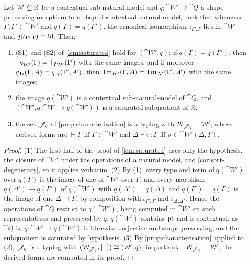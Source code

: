\begin{corollary}\label{cor:sub-typing}
    Let $\mathcal{W}' \subseteq \mathcal{R}$ be a contextual sub-natural-model and $q : \cat{W}' \to \cat{Q}$ a shape-preserving morphism to a shaped contextual natural model, such that whenever $\Gamma, \Gamma' \in \cat{W}'$ and $q(\Gamma) = q(\Gamma')$, the canonical isomorphism $\iota_{\Gamma', \Gamma}$ lies in $\cat{W}'$ and $q(\iota_{\Gamma', \Gamma}) = \mathrm{id}$. Then:
    \begin{enumerate}
        \item (S1) and (S2) of \cref{lem:saturated} hold for $(\cat{W}', q)$: if $q(\Gamma) = q(\Gamma')$, then $\mathsf{Ty}_{\mathcal{W}'}(\Gamma) = \mathsf{Ty}_{\mathcal{W}'}(\Gamma')$ with the same images, and if moreover $q_{\mathsf{Ty}}(\Gamma, A) = q_{\mathsf{Ty}}(\Gamma', A')$, then $\mathsf{Tm}_{\mathcal{W}'}(\Gamma, A) = \mathsf{Tm}_{\mathcal{W}'}(\Gamma', A')$ with the same images;
        \item the image $q(\cat{W}')$ is a contextual sub-natural-model of $\cat{Q}$, and $(\cat{W}', q : \cat{W}' \to q(\cat{W}'))$ is a saturated subquotient of $\mathcal{R}$;
        \item the set $\mathscr{J}_q$ of \cref{prop:characterisation} is a typing with $\mathcal{W}_{\mathscr{J}_q} = \mathcal{W}'$, whose derived forms are $\vdash \Gamma$ iff $\Gamma \in \cat{W}'$ and $\Delta \vdash \sigma : \Gamma$ iff $\sigma \in \cat{W}'(\Delta, \Gamma)$.
    \end{enumerate}
\end{corollary}

\begin{proof}
    (1) The first half of the proof of \cref{lem:saturated} uses only the hypothesis, the closure of $\cat{W}'$ under the operations of a natural model, and \cref{cor:sort-degeneracy}, so it applies verbatim. (2) By (1), every type and term of $q(\cat{W}')$ over $q(\Gamma)$ is the image of one of $\cat{W}'$ over $\Gamma$, and every morphism $q(\Delta') \to q(\Gamma')$ of $q(\cat{W}')$ with $q(\Delta') = q(\Delta)$ and $q(\Gamma') = q(\Gamma)$ is the image of one $\Delta \to \Gamma$, by composition with $\iota_{\Gamma', \Gamma}$ and $\iota_{\Delta, \Delta'}$. Hence the operations of $\cat{Q}$ restrict to $q(\cat{W}')$, being computed in $\cat{W}'$ on such representatives and preserved by $q$; $q(\cat{W}')$ contains $\mathrm{pt}$ and is contextual, as $\cat{Q}$ is; $q : \cat{W}' \to q(\cat{W}')$ is fibrewise surjective and shape-preserving; and the subquotient is saturated by hypothesis. (3) By \cref{prop:characterisation} applied to (2), $\mathscr{J}_q$ is a typing with $(\mathcal{W}_{\mathscr{J}_q}, [\_]) \cong (\mathcal{W}', q)$, in particular $\mathcal{W}_{\mathscr{J}_q} = \mathcal{W}'$; the derived forms are computed in its proof.
\end{proof}

